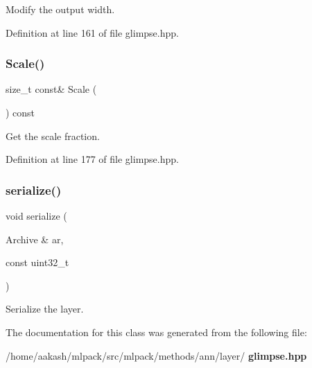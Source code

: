 Modify the output width. 



Definition at line 161 of file glimpse.\+hpp.

\mbox{\label{classmlpack_1_1ann_1_1Glimpse_a5672c05ae5dd46d3887b137e2368b121}} 
\subsubsection{Scale()}
{\footnotesize\ttfamily size\+\_\+t const\& Scale (\begin{DoxyParamCaption}{ }\end{DoxyParamCaption}) const\hspace{0.3cm}{\ttfamily [inline]}}



Get the scale fraction. 



Definition at line 177 of file glimpse.\+hpp.

\mbox{\label{classmlpack_1_1ann_1_1Glimpse_a65cba07328997659bec80b9879b15a51}} 
\subsubsection{serialize()}
{\footnotesize\ttfamily void serialize (\begin{DoxyParamCaption}\item[{Archive \&}]{ar,  }\item[{const uint32\+\_\+t}]{ }\end{DoxyParamCaption})}



Serialize the layer. 



The documentation for this class was generated from the following file\+:\begin{DoxyCompactItemize}
\item 
/home/aakash/mlpack/src/mlpack/methods/ann/layer/\textbf{ glimpse.\+hpp}\end{DoxyCompactItemize}
